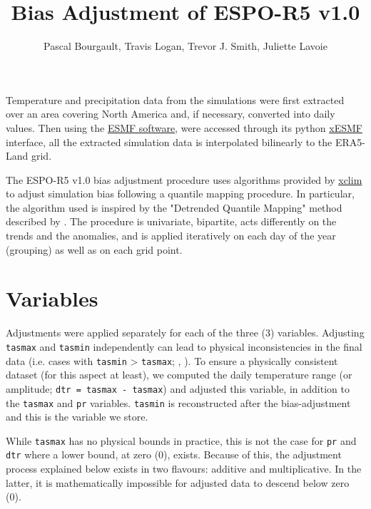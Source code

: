 \documentclass[letterpaper,10pt]{article}
\begin{document}
\title{Bias Adjustment of ESPO-R5 v1.0}
\author{Pascal Bourgault, Travis Logan, Trevor J. Smith, Juliette Lavoie}
\maketitle

Temperature and precipitation data from the simulations were first extracted over an area covering North America and, if necessary, converted into daily values.
Then using the \href{https://earthsystemmodeling.org/regrid/}{ESMF software}, were accessed through its python \href{https://xesmf.readthedocs.io/en/latest/}{xESMF} interface, all the extracted simulation data is interpolated bilinearly to the ERA5-Land grid.

The ESPO-R5 v1.0 bias adjustment procedure uses algorithms provided by \href{https://xclim.readthedocs.io/en/stable/sdba.html}{xclim} to adjust simulation bias following a quantile mapping procedure.
In particular, the algorithm used is inspired by the "Detrended Quantile Mapping" method described by \cite{Cannon15}.
The procedure is univariate, bipartite, acts differently on the trends and the anomalies, and is applied iteratively on each day of the year (grouping) as well as on each grid point.

\section{Variables}
Adjustments were applied separately for each of the three (3) variables.
Adjusting \texttt{tasmax} and \texttt{tasmin} independently can lead to physical inconsistencies in the final data (i.e. cases with \texttt{tasmin} > \texttt{tasmax}; \cite{Thrasher12}, \cite{Agbazo20}).
To ensure a physically consistent dataset (for this aspect at least), we computed the daily temperature range (or amplitude; \texttt{dtr = tasmax - tasmax}) and adjusted this variable, in addition to the \texttt{tasmax} and \texttt{pr} variables.
\texttt{tasmin} is reconstructed after the bias-adjustment and this is the variable we store.

While \texttt{tasmax} has no physical bounds in practice, this is not the case for \texttt{pr} and \texttt{dtr} where a lower bound, at zero (0), exists.
Because of this, the adjustment process explained below exists in two flavours: additive and multiplicative.
In the latter, it is mathematically impossible for adjusted data to descend below zero (0).
\end{document}
